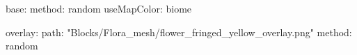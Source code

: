base:
  method: random
  useMapColor: biome
  
overlay:
  path: "Blocks/Flora_mesh/flower_fringed_yellow_overlay.png"
  method: random